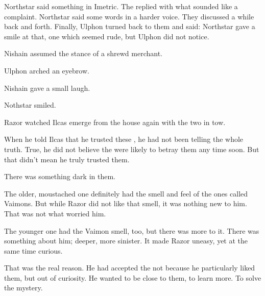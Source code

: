 Northstar said something in Imetric. 
The \Ispan{} replied with what sounded like a complaint. 
Northstar said some words in a harder voice. 
They discussed a while back and forth. Finally, Ulphon turned back to them and said: 
Northstar gave a smile at that, one which seemed rude, but Ulphon did not notice. 

Nishain assumed the stance of a shrewd merchant. 

Ulphon arched an eyebrow. 

Nishain gave a small laugh. 

Nothstar smiled. 







\begin{comment}
\subsection{Razor broods}
\end{comment}

\new
Razor watched Ilcas emerge from the house again with the two \humans{} in tow. 


When he told Ilcas that he trusted these \humans, he had not been telling the whole truth. 
True, he did not believe the \humans{} were likely to betray them any time soon. 
But that didn't mean he truly trusted them. 

There was something dark in them. 

The older, moustached one definitely had the smell and feel of the ones called Vaimons. 
But while Razor did not like that smell, it was nothing new to him. 
That was not what worried him. 

The younger one had the Vaimon smell, too, but there was more to it. 
There was something about him; deeper, more sinister. 
It made Razor uneasy, yet at the same time curious. 

That was the real reason. 
He had accepted the \humans{} not because he particularly liked them, but out of curiosity. 
He wanted to be close to them, to learn more. 
To solve the mystery. 







